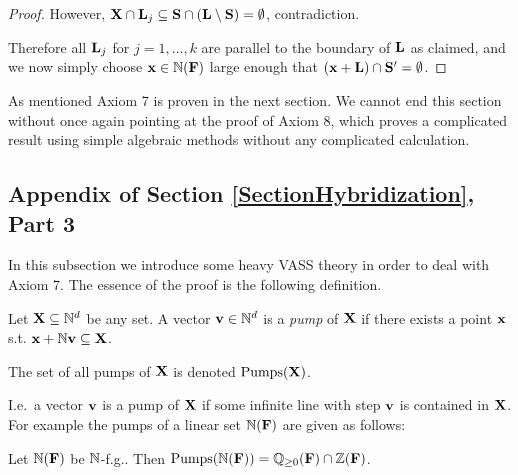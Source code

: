 \begin{proof}
However, \(\mathbf{X} \cap \mathbf{L}_j \subseteq \mathbf{S} \cap (\mathbf{L} \setminus \mathbf{S})=\emptyset\), contradiction.

Therefore all \(\mathbf{L}_j\) for \(j=1, \dots, k\) are parallel to the boundary of \(\mathbf{L}\) as claimed, and we now simply choose \(\mathbf{x} \in \mathbb{N}(\mathbf{F})\) large enough that \((\mathbf{x}+\mathbf{L}) \cap \mathbf{S}'=\emptyset\). 
%
\end{proof}

As mentioned Axiom 7 is proven in the next section. We cannot end this section without once again pointing at the proof of Axiom 8, which proves a complicated result using simple algebraic methods without any complicated calculation.

\subsection{Appendix of Section \ref{SectionHybridization}, Part 3}

In this subsection we introduce some heavy VASS theory in order to deal with Axiom 7. The essence of the proof is the following definition.

\begin{definition}
Let \(\mathbf{X} \subseteq \mathbb{N}^d\) be any set. A vector \(\mathbf{v} \in \mathbb{N}^d\) is a \emph{pump} of \(\mathbf{X}\) if there exists a point \(\mathbf{x}\) s.t. \(\mathbf{x}+\mathbb{N} \mathbf{v} \subseteq \mathbf{X}\).

The set of all pumps of \(\mathbf{X}\) is denoted \(\operatorname{Pumps}(\mathbf{X})\).
%
\end{definition}

I.e.\ a vector \(\mathbf{v}\) is a pump of \(\mathbf{X}\) if some infinite line with step \(\mathbf{v}\) is contained in \(\mathbf{X}\). For example the pumps of a linear set \(\mathbb{N}(\mathbf{F})\) are given as follows:

\begin{lemma}\cite[Lemma F.1, special case]{Leroux13}
Let \(\mathbb{N}(\mathbf{F})\) be \(\mathbb{N}\)-f.g.. Then \(\operatorname{Pumps}(\mathbb{N}(\mathbf{F}))=\mathbb{Q}_{\geq 0}(\mathbf{F}) \cap \mathbb{Z}(\mathbf{F})\). \label{LemmaPumpsLinearSet}
\end{lemma}

